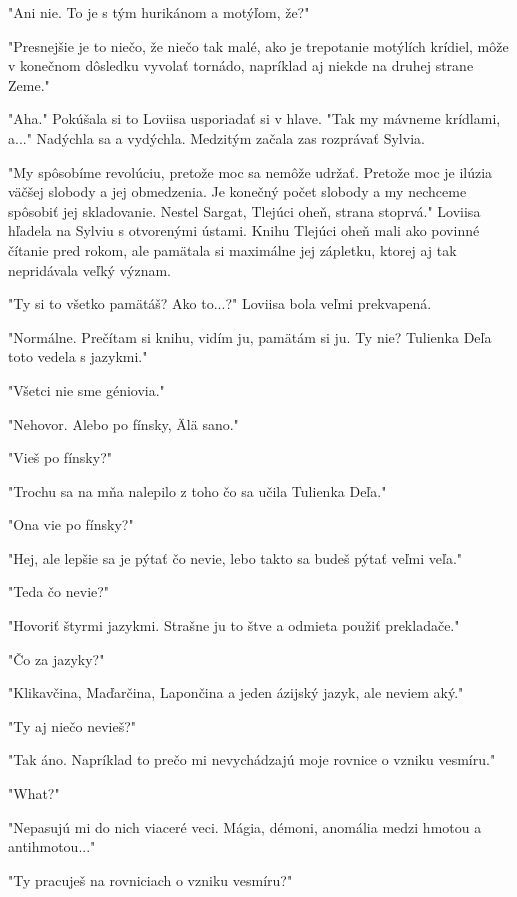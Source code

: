 \documentclass{book}
\begin{document}
"$ $Ani nie. To je s tým hurikánom a motýľom, že?"$ $ 

"$ $Presnejšie je to niečo, že niečo tak malé, ako je trepotanie motýlích krídiel, môže v konečnom dôsledku vyvolať tornádo, napríklad aj niekde na druhej strane Zeme."$ $ 

"$ $Aha."$ $  Pokúšala si to Loviisa usporiadať si v hlave. "$ $Tak my mávneme krídlami, a..."$ $  Nadýchla sa a vydýchla. Medzitým začala zas rozprávať Sylvia.

"$ $My spôsobíme revolúciu, pretože moc sa nemôže udržať. Pretože moc je ilúzia väčšej slobody a jej obmedzenia. Je konečný počet slobody a my nechceme spôsobiť jej skladovanie. Nestel Sargat, Tlejúci oheň, strana stoprvá."$ $  Loviisa hľadela na Sylviu s otvorenými ústami. Knihu Tlejúci oheň mali ako povinné čítanie pred rokom, ale pamätala si maximálne jej zápletku, ktorej aj tak nepridávala veľký význam.

"$ $Ty si to všetko pamätáš? Ako to...?"$ $  Loviisa bola veľmi prekvapená.

"$ $Normálne. Prečítam si knihu, vidím ju, pamätám si ju. Ty nie? Tulienka Deľa toto vedela s jazykmi."$ $ 

"$ $Všetci nie sme géniovia."$ $ 

"$ $Nehovor. Alebo po fínsky, Älä sano."$ $ 

"$ $Vieš po fínsky?"$ $ 

"$ $Trochu sa na mňa nalepilo z toho čo sa učila Tulienka Deľa."$ $ 

"$ $Ona vie po fínsky?"$ $ 

"$ $Hej, ale lepšie sa je pýtať čo nevie, lebo takto sa budeš pýtať veľmi veľa."$ $ 

"$ $Teda čo nevie?"$ $ 

"$ $Hovoriť štyrmi jazykmi. Strašne ju to štve a odmieta použiť prekladače."$ $ 

"$ $Čo za jazyky?"$ $ 

"$ $Klikavčina, Maďarčina, Lapončina a jeden ázijský jazyk, ale neviem aký."$ $ 

"$ $Ty aj niečo nevieš?"$ $ 

"$ $Tak áno. Napríklad to prečo mi nevychádzajú moje rovnice o vzniku vesmíru."$ $ 

"$ $What?"$ $ 

"$ $Nepasujú mi do nich viaceré veci. Mágia, démoni, anomália medzi hmotou a antihmotou..."$ $ 

"$ $Ty pracuješ na rovniciach o vzniku vesmíru?"$ $ 
\end{document}
